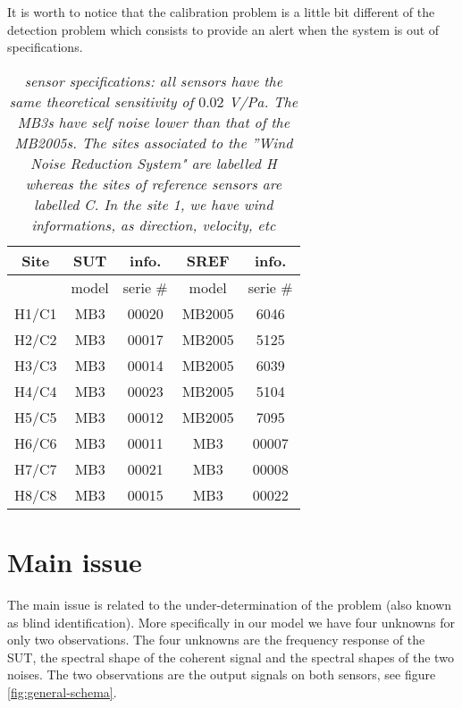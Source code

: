 It is worth to notice that the calibration problem is a little bit different of the detection problem which consists to provide an alert when the system is out of specifications.


\begin{table}[h]
\begin{center}
\begin{tabular}{|c||cc|cc||}
\hline
Site & SUT & info.& SREF & info.
\\
\hline
     & model&serie \#     & model&serie \#
\\
H1/C1& MB3 & 00020  & MB2005& 6046
\\
H2/C2& MB3  &  00017  & MB2005& 5125
\\
H3/C3& MB3  &  00014  & MB2005 &6039
\\
H4/C4& MB3  &  00023  & MB2005& 5104
\\
H5/C5& MB3   & 00012  & MB2005 &7095
\\
H6/C6& MB3  &  00011  & MB3 &00007
\\
H7/C7& MB3   & 00021  & MB3 &00008
\\
H8/C8& MB3   & 00015  & MB3 &00022
\\
\hline
\end{tabular}
\parbox{12 cm}
{
    \caption{\protect\small\it  sensor specifications: all sensors have the same theoretical sensitivity of $0.02$ V/Pa. The MB3s have self noise lower than that of the MB2005s. The sites associated to the ''Wind Noise Reduction System" are labelled H whereas  the sites of reference sensors are labelled C. In the site 1, we have wind informations, as direction, velocity, etc}
    \label{tab:sensor-specifications}
}
\end{center}
\end{table}


 \newpage
\section{Main issue}

The main issue is related to the under-determination of the problem (also known as blind identification). More specifically in our model we have four unknowns for only two observations. The four unknowns are the frequency response of the SUT, the spectral shape of the coherent signal and the spectral shapes of the two noises. The two observations are the output signals on both sensors, see figure \ref{fig:general-schema}.

